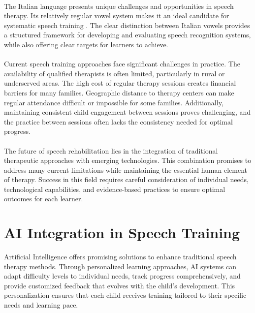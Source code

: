 \paragraph{}
The Italian language presents unique challenges and opportunities in speech therapy. Its relatively regular vowel system makes it an ideal candidate for systematic speech training \cite{italian_phonetics2021}. The clear distinction between Italian vowels provides a structured framework for developing and evaluating speech recognition systems, while also offering clear targets for learners to achieve.

\paragraph{}
Current speech training approaches face significant challenges in practice. The availability of qualified therapists is often limited, particularly in rural or underserved areas. The high cost of regular therapy sessions creates financial barriers for many families. Geographic distance to therapy centers can make regular attendance difficult or impossible for some families. Additionally, maintaining consistent child engagement between sessions proves challenging, and the practice between sessions often lacks the consistency needed for optimal progress.

\paragraph{}
The future of speech rehabilitation lies in the integration of traditional therapeutic approaches with emerging technologies. This combination promises to address many current limitations while maintaining the essential human element of therapy. Success in this field requires careful consideration of individual needs, technological capabilities, and evidence-based practices to ensure optimal outcomes for each learner.

\section{AI Integration in Speech Training}
\label{sec:ai_integration}

\paragraph{}
Artificial Intelligence offers promising solutions to enhance traditional speech therapy methods. Through personalized learning approaches, AI systems can adapt difficulty levels to individual needs, track progress comprehensively, and provide customized feedback that evolves with the child's development. This personalization ensures that each child receives training tailored to their specific needs and learning pace.

